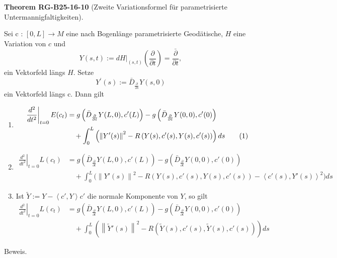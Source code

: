\documentclass[10pt, letterpaper]{article}
\newcommand{\CustomHeading}[3]{%
  \par\medskip\noindent%
  \textbf{#1 #2} \textnormal{(#3)}.\enskip%
}
\newenvironment{THEO}[2]{\begin{unitbox}\CustomHeading{Theorem}{#1}{#2}}{\end{unitbox}}
\begin{document}
\begin{THEO}{RG-B25-16-10}{Zweite Variationsformel für parametrisierte Untermannigfaltigkeiten}
Sei c : $[0, L] \rightarrow M$ eine nach Bogenlänge parametrisierte Geodätische, $H$ eine Variation von $c$ und
$$
Y(s, t):=\left.d H\right|_{(s, t)}\left(\frac{\partial}{\partial t}\right)=\frac{\bar{\partial}}{\partial t},
$$
ein Vektorfeld längs $H$. Setze
$$
Y^{\prime}(s):=\bar{D}_{\frac{\partial}{\partial s}} Y(s, 0)
$$
ein Vektorfeld längs c. Dann gilt
\begin{enumerate}
  \item
  \begin{align}
  \left.\frac{d^{2}}{d t^{2}}\right|_{t=0} E(c_t)
  &= g\left(\bar{D}_{\frac{\partial}{\partial t}} Y(L, 0), c'(L)\right)
  - g\left(\bar{D}_{\frac{\partial}{\partial t}} Y(0, 0), c'(0)\right) \notag \\
  &\quad + \int_0^L \left( \left\| Y'(s) \right\|^2
  - R\left(Y(s), c'(s), Y(s), c'(s)\right) \right) ds \tag{1}
  \end{align}

  \item
  \begin{align*}
  \left.\frac{d^{2}}{d t^{2}}\right|_{t=0} L(c_t)
  &= g\left(\bar{D}_{\frac{\partial}{\partial t}} Y(L, 0), c'(L)\right)
  - g\left(\bar{D}_{\frac{\partial}{\partial t}} Y(0, 0), c'(0)\right) \\
  &\quad + \int_0^L \Big( \left\| Y'(s) \right\|^2
  - R\left(Y(s), c'(s), Y(s), c'(s)\right)
  - \left\langle c'(s), Y'(s) \right\rangle^2 \Big) ds
  \end{align*}

  \item Ist $\tilde{Y} := Y - \left\langle c', Y \right\rangle c'$ die normale Komponente von $Y$, so gilt
  \begin{align*}
  \left.\frac{d^{2}}{d t^{2}}\right|_{t=0} L(c_t)
  &= g\left(\bar{D}_{\frac{\partial}{\partial t}} Y(L, 0), c'(L)\right)
  - g\left(\bar{D}_{\frac{\partial}{\partial t}} Y(0, 0), c'(0)\right) \\
  &\quad + \int_0^L \left( \left\| \tilde{Y}'(s) \right\|^2
  - R\left(\tilde{Y}(s), c'(s), \tilde{Y}(s), c'(s)\right) \right) ds
  \end{align*}
\end{enumerate}
\end{THEO}


Beweis. 
\end{document}
